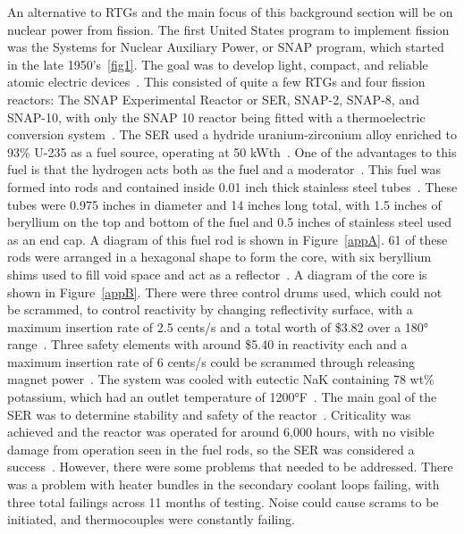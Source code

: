 \documentclass{article}
\begin{document}
    An alternative to RTGs and the main focus of this background section will be on nuclear power from fission. The first United States program to implement fission was the Systems for Nuclear Auxiliary Power, or SNAP program, which started in the late 1950's~\ref{fig1}. The goal was to develop light, compact, and reliable atomic electric devices~\cite{voss1984snap}. This consisted of quite a few RTGs and four fission reactors: The SNAP Experimental Reactor or SER, SNAP-2, SNAP-8, and SNAP-10, with only the SNAP 10 reactor being fitted with a thermoelectric conversion system~\cite{websnap}. The SER used a hydride uranium-zirconium alloy enriched to 93\% U-235 as a fuel source, operating at 50 kWth~\cite{voss1984snap}. One of the advantages to this fuel is that the hydrogen acts both as the fuel and a moderator~\cite{voss1984snap}. This fuel was formed into rods and contained inside 0.01 inch thick stainless steel tubes~\cite{beall1962final}. These tubes were 0.975 inches in diameter and 14 inches long total, with 1.5 inches of beryllium on the top and bottom of the fuel and 0.5 inches of stainless steel used as an end cap. A diagram of this fuel rod is shown in Figure~\ref{appA}. 61 of these rods were arranged in a hexagonal shape to form the core, with six beryllium shims used to fill void space and act as a reflector~\cite{lords1994snap}. A diagram of the core is shown in Figure~\ref{appB}. There were three control drums used, which could not be scrammed, to control reactivity by changing reflectivity surface, with a maximum insertion rate of 2.5 cents/s and a total worth of \$3.82 over a 180° range~\cite{lords1994snap}. Three safety elements with around \$5.40 in reactivity each and a maximum insertion rate of 6 cents/s could be scrammed through releasing magnet power~\cite{lords1994snap}. The system was cooled with eutectic NaK containing 78 wt\% potassium, which had an outlet temperature of 1200°F~\cite{beall1962final}. The main goal of the SER was to determine stability and safety of the reactor~\cite{voss1984snap}. Criticality was achieved and the reactor was operated for around 6,000 hours, with no visible damage from operation seen in the fuel rods, so the SER was considered a success~\cite{beall1962final}.  However, there were some problems that needed to be addressed. There was a problem with heater bundles in the secondary coolant loops failing, with three total failings across 11 months of testing. Noise could cause scrams to be initiated, and thermocouples were constantly failing.
\end{document}
